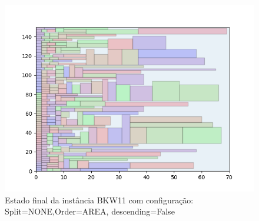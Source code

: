 \begin{figure}[H]
    \centering
    \caption[]{Estado final da instância BKW11 com configuração: Split=NONE,Order=AREA, descending=False}
    \label{fig:bkw11-none-area-false}
    \includegraphics[scale=0.5]{output/figures/bkw/bkw11/none/area/false/000}
\end{figure}